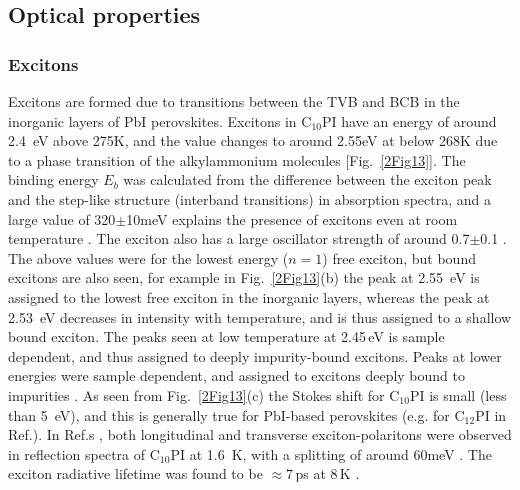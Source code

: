 \subsection{Optical properties}
\subsubsection{Excitons}
Excitons are formed due to transitions between the TVB and BCB in the inorganic layers of PbI perovskites. Excitons in $\textrm{C}_{10}$PI have an energy of around 2.4~eV above 275K, and the value changes to around 2.55eV at below 268K due to a phase transition of the alkylammonium molecules [Fig.\ \ref{2Fig13}]. The binding energy $E_b$ was calculated from the difference between the exciton peak and the step-like structure (interband transitions) in absorption spectra, and a large value of 320$\pm$10meV explains the presence of excitons even at room temperature \cite{Ishihara1990}. The exciton also has a large oscillator strength of around 0.7$\pm$0.1 \cite{Ishihara1990}. The above values were for the lowest energy ($n=1$) free exciton, but bound excitons are also seen, for example in Fig.\ \ref{2Fig13}(b) the peak at 2.55~eV  is assigned to the lowest free exciton in the inorganic layers, whereas the peak at 2.53~eV decreases in intensity with temperature, and is thus assigned to a shallow bound exciton. The peaks seen at low temperature at 2.45\,eV is sample dependent, and thus assigned to deeply impurity-bound excitons. Peaks at lower energies were sample dependent, and assigned to excitons deeply bound to impurities \cite{Ishihara1990}. As seen from Fig.\ \ref{2Fig13}(c) the Stokes shift for $\textrm{C}_{10}$PI is small (less than 5~eV), and this is generally true for PbI-based perovskites (e.g. for $\textrm{C}_{12}$PI in Ref.\cite{Pradeesh2009}). In Ref.s \cite{Ishihara1990, Ishihara1989}, both longitudinal and transverse exciton-polaritons were observed in reflection spectra of $\textrm{C}_{10}$PI at 1.6~K, with a splitting of around 60meV \cite{Ishihara1990}. The exciton radiative lifetime was found to be $\approx 7$\,ps at 8\,K \cite{Kondo1998a}.

